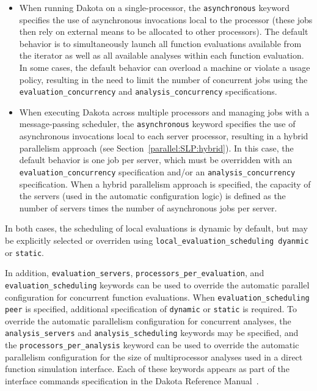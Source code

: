 \begin{itemize}
\item When running Dakota on a single-processor, the
  \texttt{asynchronous} keyword specifies the use of asynchronous
  invocations local to the processor (these jobs then rely on external
  means to be allocated to other processors). The default behavior is
  to simultaneously launch all function evaluations available from the
  iterator as well as all available analyses within each function
  evaluation. In some cases, the default behavior can overload a
  machine or violate a usage policy, resulting in the need to limit
  the number of concurrent jobs using the
  \texttt{evaluation\_concurrency} and \texttt{analysis\_concurrency}
  specifications. 

\item When executing Dakota across multiple processors and managing
  jobs with a message-passing scheduler, the \texttt{asynchronous}
  keyword specifies the use of asynchronous invocations local to each
  server processor, resulting in a hybrid parallelism approach (see
  Section~\ref{parallel:SLP:hybrid}). In this case, the default
  behavior is one job per server, which must be overridden with an
  \texttt{evaluation\_concurrency} specification and/or an
  \texttt{analysis\_concurrency} specification. When a hybrid
  parallelism approach is specified, the capacity of the servers (used
  in the automatic configuration logic) is defined as the number of
  servers times the number of asynchronous jobs per server.
\end{itemize}

In both cases, the scheduling of local evaluations is dynamic by
default, but may be explicitly selected or overriden using
\texttt{local\_evaluation\_scheduling dyanmic} or \texttt{static}.

In addition, \texttt{evaluation\_servers},
\texttt{processors\_per\_evaluation}, and
\texttt{evaluation\_scheduling} keywords can be used to
override the automatic parallel configuration for concurrent
function evaluations. When \texttt{evaluation\_scheduling peer} is
specified, additional specification of \texttt{dynamic} or
\texttt{static} is required. To override the automatic parallelism
configuration for concurrent analyses, the \texttt{analysis\_servers} 
and \texttt{analysis\_scheduling} keywords may be specified, and
the \texttt{processors\_per\_analysis} keyword can be used to override
the automatic parallelism configuration for the size of multiprocessor
analyses used in a direct function simulation interface. Each of these
keywords appears as part of the interface commands specification in
the Dakota Reference Manual~\cite{RefMan}.


